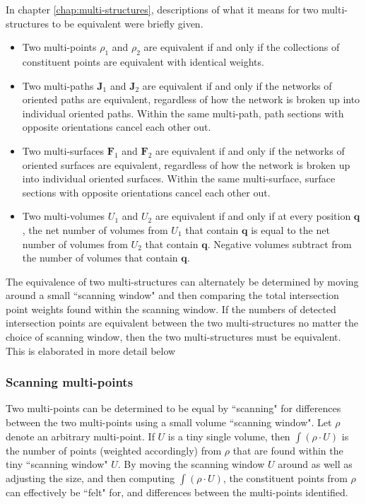 In chapter \ref{chap:multi-structures}, descriptions of what it means for two multi-structures to be equivalent were briefly given. 

\begin{itemize}
\item Two multi-points \(\rho_1\) and \(\rho_2\) are equivalent if and only if the collections of constituent points are equivalent with identical weights. 
\item Two multi-paths \(\mathbf{J}_1\) and \(\mathbf{J}_2\) are equivalent if and only if the networks of oriented paths are equivalent, regardless of how the network is broken up into individual oriented paths. Within the same multi-path, path sections with opposite orientations cancel each other out. 
\item Two multi-surfaces \(\mathbf{F}_1\) and \(\mathbf{F}_2\) are equivalent if and only if the networks of oriented surfaces are equivalent, regardless of how the network is broken up into individual oriented surfaces. Within the same multi-surface, surface sections with opposite orientations cancel each other out. 
\item Two multi-volumes \(U_1\) and \(U_2\) are equivalent if and only if at every position \(\mathbf{q}\), the net number of volumes from \(U_1\) that contain \(\mathbf{q}\) is equal to the net number of volumes from \(U_2\) that contain \(\mathbf{q}\). Negative volumes subtract from the number of volumes that contain \(\mathbf{q}\). 
\end{itemize}

The equivalence of two multi-structures can alternately be determined by moving around a small ``scanning window" and then comparing the total intersection point weights found within the scanning window. If the numbers of detected intersection points are equivalent between the two multi-structures no matter the choice of scanning window, then the two multi-structures must be equivalent. This is elaborated in more detail below

\subsubsection{Scanning multi-points}

Two multi-points can be determined to be equal by ``scanning" for differences between the two multi-points using a small volume ``scanning window". Let \(\rho\) denote an arbitrary multi-point. If \(U\) is a tiny single volume, then \(\int (\rho \cdot U)\) is the number of points (weighted accordingly) from \(\rho\) that are found within the tiny ``scanning window" \(U\). By moving the scanning window \(U\) around as well as adjusting the size, and then computing \(\int (\rho \cdot U)\), the constituent points from \(\rho\) can effectively be ``felt" for, and differences between the multi-points identified.  

